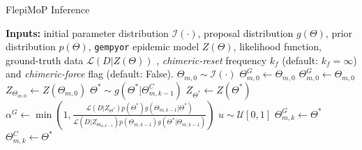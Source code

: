 \documentclass[6pt,a4]{article}
\begin{document}
\begin{algorithm}
\caption{FlepiMoP Inference}\label{flepi-inference}
\begin{algorithmic}[1]
\State \textbf{Inputs:} initial parameter distribution $\mathcal{I}(\cdot)$, proposal distribution $g(\Theta)$, prior distribution $p(\Theta)$, \texttt{gempyor} epidemic model $Z(\Theta)$, likelihood function, ground-truth data $\mathcal{L}(D|Z(\Theta))$ , \textit{chimeric-reset} frequency $k_f$ (default: $k_f=\infty$) and \textit{chimeric-force} flag (default: False).
 
    \State $\Theta_{m,0} \sim \mathcal{I}(\cdot)$ 
    \State  $\Theta^G_{m,0} \gets \Theta_{m,0}$ 
    \State $\Theta^G_{m,0} \gets \Theta_{m,0}$ 
    \State $Z_{\Theta_{m,0}} \gets Z(\Theta_{m,0})$ 
   
    \State  $\Theta^* \sim g(\Theta^*|\Theta^C_{m,k-1})$ 
    \State $Z_{\Theta^*} \gets Z(\Theta^*)$ 
      \State $\alpha^G \gets\min \left(1, \frac{\mathcal{L}(D|Z_{\Theta^*}) p(\Theta^*) g(\Theta_{m,k-1}|\Theta^*)}{\mathcal{L}(D|Z_{\Theta_{m,k-1}}) p(\Theta_{m,k-1}) g(\Theta^*|\Theta_{m,k-1})} \right)$ 
      \State$ u \sim \mathcal{U}[0,1]$
       
        \State $\Theta^G_{m,k} \gets \Theta^*$
        \State $\Theta_{m,k}^C \gets \Theta^*$

\end{algorithmic}
\end{algorithm}
\end{document}
